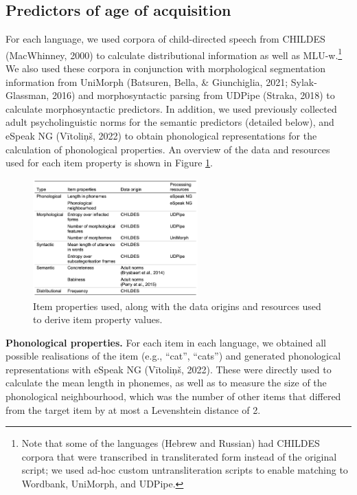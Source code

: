 \documentclass[10pt, letterpaper]{article}
\newenvironment{CodeChunk}{}{}
\begin{document}
\hypertarget{predictors-of-age-of-acquisition}{%
\subsection{Predictors of age of
acquisition}\label{predictors-of-age-of-acquisition}}

For each language, we used corpora of child-directed speech from CHILDES
(MacWhinney, 2000) to calculate distributional information as well as
MLU-w.\footnote{Note that some of the languages (Hebrew and Russian) had
  CHILDES corpora that were transcribed in transliterated form instead
  of the original script; we used ad-hoc custom untransliteration
  scripts to enable matching to Wordbank, UniMorph, and UDPipe.} We also
used these corpora in conjunction with morphological segmentation
information from UniMorph (Batsuren, Bella, \& Giunchiglia, 2021;
Sylak-Glassman, 2016) and morphosyntactic parsing from UDPipe (Straka,
2018) to calculate morphosyntactic predictors. In addition, we used
previously collected adult psycholinguistic norms for the semantic
predictors (detailed below), and eSpeak NG (Vītoliņš, 2022) to obtain
phonological representations for the calculation of phonological
properties. An overview of the data and resources used for each item
property is shown in Figure \ref{fig:sources}.

\begin{CodeChunk}
\begin{figure}[ht]

{\centering \includegraphics[width=240px]{figs/sources}

}

\caption[Item properties used, along with the data origins and resources used to derive item property values]{Item properties used, along with the data origins and resources used to derive item property values.}\label{fig:sources}
\end{figure}
\end{CodeChunk}

\textbf{Phonological properties.} For each item in each language, we
obtained all possible realisations of the item (e.g., ``cat'', ``cats'')
and generated phonological representations with eSpeak NG (Vītoliņš,
2022). These were directly used to calculate the mean length in
phonemes, as well as to measure the size of the phonological
neighbourhood, which was the number of other items that differed from
the target item by at most a Levenshtein distance of 2.
\end{document}
